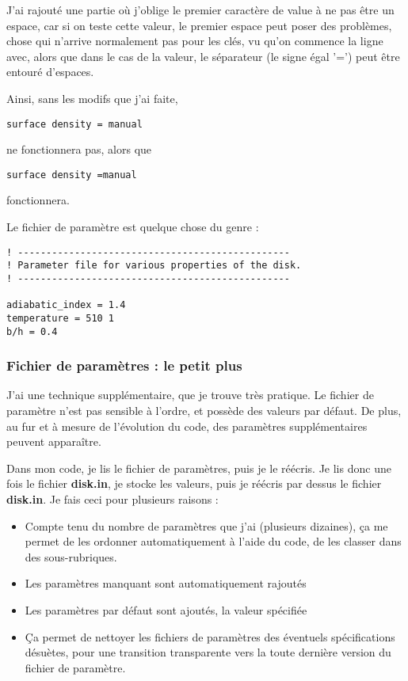 \begin{attention}
J'ai rajouté une partie où j'oblige le premier caractère de value à ne pas être un espace, car si on teste cette valeur, le premier espace peut poser des problèmes, chose qui n'arrive normalement pas pour les clés, vu qu'on commence la ligne avec, alors que dans le cas de la valeur, le séparateur (le signe égal '=') peut être entouré d'espaces.

Ainsi, sans les modifs que j'ai faite, 
\begin{verbatim}
surface density = manual
\end{verbatim}
ne fonctionnera pas, alors que
\begin{verbatim}
surface density =manual
\end{verbatim}
fonctionnera.
\end{attention}


Le fichier de paramètre est quelque chose du genre :
\begin{verbatim}
! ------------------------------------------------
! Parameter file for various properties of the disk. 
! ------------------------------------------------

adiabatic_index = 1.4
temperature = 510 1
b/h = 0.4
\end{verbatim}

\subsubsection{Fichier de paramètres : le petit plus}
J'ai une technique supplémentaire, que je trouve très pratique. Le fichier de paramètre n'est pas sensible à l'ordre, et possède des valeurs par défaut. De plus, au fur et à mesure de l'évolution du code, des paramètres supplémentaires peuvent apparaître. 

Dans mon code, je lis le fichier de paramètres, puis je le réécris. Je lis donc une fois le fichier \textbf{disk.in}, je stocke les valeurs, puis je réécris par dessus le fichier \textbf{disk.in}. Je fais ceci pour plusieurs raisons : 
\begin{itemize}
\item Compte tenu du nombre de paramètres que j'ai (plusieurs dizaines), ça me permet de les ordonner automatiquement à l'aide du code, de les classer dans des sous-rubriques. 
\item Les paramètres manquant sont automatiquement rajoutés
\item Les paramètres par défaut sont ajoutés, la valeur spécifiée
\item Ça permet de nettoyer les fichiers de paramètres des éventuels spécifications désuètes, pour une transition transparente vers la toute dernière version du fichier de paramètre.
\end{itemize}


